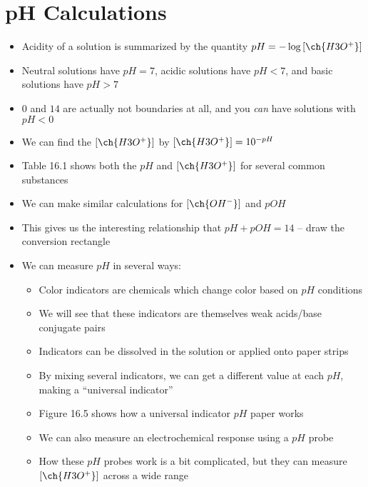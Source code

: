 \documentclass[12pt, openany, letterpaper]{memoir}
\begin{document}
\section{pH Calculations}
\begin{itemize}
	\item Acidity of a solution is summarized by the quantity $pH = -\log\left[\ch{H3O^+}\right]$
	\item Neutral solutions have $pH=7$, acidic solutions have $pH<7$, and basic solutions have $pH>7$
	\item $0$ and $14$ are actually not boundaries at all, and you \emph{can} have solutions with $pH<0$
	\item We can find the $\left[\ch{H3O^+}\right]$ by $\left[\ch{H3O^+}\right]=10^{-pH}$
	\item Table 16.1 shows both the $pH$ and $\left[\ch{H3O^+}\right]$ for several common substances
	\item We can make similar calculations for $\left[\ch{OH^-}\right]$ and $pOH$
	\item This gives us the interesting relationship that $pH+pOH=14$ -- draw the conversion rectangle
	\item We can measure $pH$ in several ways:
	\begin{itemize}
		\item Color indicators are chemicals which change color based on $pH$ conditions
		\item We will see that these indicators are themselves weak acids/base conjugate pairs
		\item Indicators can be dissolved in the solution or applied onto paper strips
		\item By mixing several indicators, we can get a different value at each $pH$, making a ``universal indicator''
		\item Figure 16.5 shows how a universal indicator $pH$ paper works
		\item We can also measure an electrochemical response using a $pH$ probe
		\item How these $pH$ probes work is a bit complicated, but they can measure $\left[\ch{H3O^+}\right]$ across a wide range
	\end{itemize}
\end{itemize}
\end{document}
